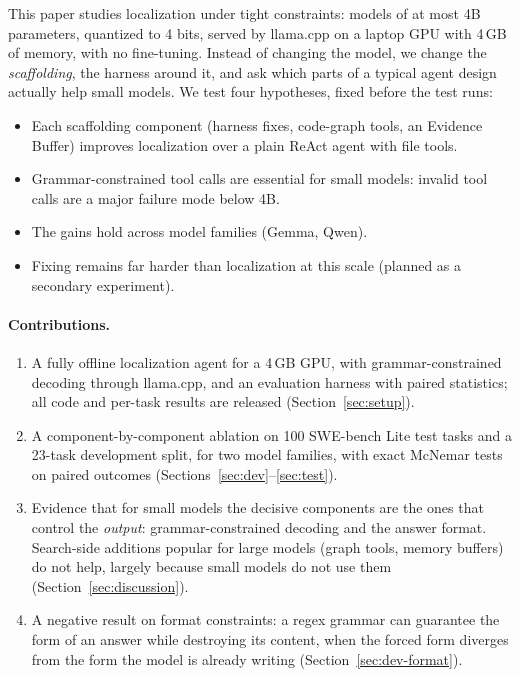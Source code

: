\documentclass[11pt]{article}
\begin{document}
This paper studies localization under tight constraints: models of at most 4B parameters, quantized to 4 bits, served by llama.cpp on a laptop GPU with 4\,GB of memory, with no fine-tuning.
Instead of changing the model, we change the \emph{scaffolding}, the harness around it, and ask which parts of a typical agent design actually help small models.
We test four hypotheses, fixed before the test runs:
\begin{itemize}
\item[\textbf{H1}] Each scaffolding component (harness fixes, code-graph tools, an Evidence Buffer) improves localization over a plain ReAct agent with file tools.
\item[\textbf{H2}] Grammar-constrained tool calls are essential for small models: invalid tool calls are a major failure mode below 4B.
\item[\textbf{H3}] The gains hold across model families (Gemma, Qwen).
\item[\textbf{H4}] Fixing remains far harder than localization at this scale (planned as a secondary experiment).
\end{itemize}

\paragraph{Contributions.}
\begin{enumerate}
\item A fully offline localization agent for a 4\,GB GPU, with grammar-constrained decoding through llama.cpp, and an evaluation harness with paired statistics; all code and per-task results are released (Section~\ref{sec:setup}).
\item A component-by-component ablation on 100 SWE-bench Lite test tasks and a 23-task development split, for two model families, with exact McNemar tests on paired outcomes (Sections~\ref{sec:dev}--\ref{sec:test}).
\item Evidence that for small models the decisive components are the ones that control the \emph{output}: grammar-constrained decoding and the answer format. Search-side additions popular for large models (graph tools, memory buffers) do not help, largely because small models do not use them (Section~\ref{sec:discussion}).
\item A negative result on format constraints: a regex grammar can guarantee the form of an answer while destroying its content, when the forced form diverges from the form the model is already writing (Section~\ref{sec:dev-format}).
\end{enumerate}
\end{document}
